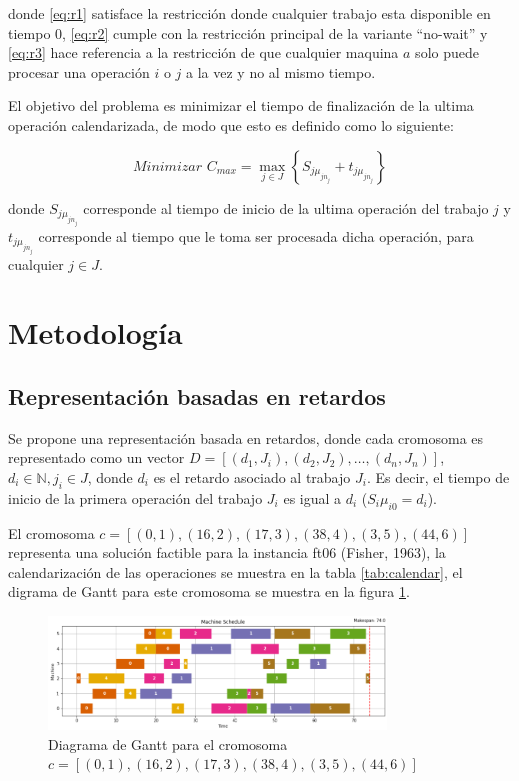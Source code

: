 \documentclass[12pt,a4paper]{article}
\begin{document}
    donde \ref{eq:r1} satisface la restricción donde cualquier trabajo esta disponible en tiempo 0, \ref{eq:r2} cumple con la restricción principal de la variante ``no-wait'' y \ref{eq:r3} hace referencia a la restricción de que cualquier maquina $a$ solo puede procesar una operación $i$ o $j$ a la vez y no al mismo tiempo.
    
    El objetivo del problema es minimizar el tiempo de finalización de la ultima operación calendarizada, de modo que esto es definido como lo siguiente: 
    
    \begin{equation}
        \textit{Minimizar } C_{max} = \max_{j \in J} \left\{ S_{j\mu_{jn_j}} + t_{j\mu_{jn_j}} \right\} 
    \end{equation}
    
    donde $S_{j\mu_{jn_j}}$ corresponde al tiempo de inicio de la ultima operación del trabajo $j$ y $t_{j\mu_{jn_j}}$ corresponde al tiempo que le toma ser procesada dicha operación, para cualquier $j \in J$.
\section{Metodología}

\subsection{Representación basadas en retardos}

Se propone una representación basada en retardos, donde cada cromosoma es representado como un vector $D = [(d_1, J_i), (d_2, J_2), \ldots, (d_n, J_n)]$, $d_i \in \mathbb{N} , j_i \in J$, donde $d_i$ es el retardo asociado al trabajo $J_i$. Es decir, el tiempo de inicio de la primera operación del trabajo $J_i$ es igual a $d_i$ ($S_i\mu_{i0} = d_i$). 

El cromosoma $c = [(0, 1), (16, 2), (17, 3), (38, 4), (3, 5), (44, 6)]$ representa una solución factible para la instancia ft06 (Fisher, 1963), la calendarización de las operaciones se muestra en la tabla \ref{tab:calendar}, el digrama de Gantt para este cromosoma se muestra en la figura \ref{fig:gant1}.

\begin{figure}[H]
    \centering
    \includegraphics[width=0.8\textwidth]{Figure/gant1.png}
    \caption{Diagrama de Gantt para el cromosoma $c = [(0, 1), (16, 2), (17, 3), (38, 4), (3, 5), (44, 6)]$}
    \label{fig:gant1}
\end{figure}
\end{document}
